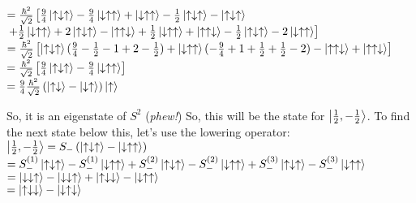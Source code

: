 \documentclass[12pt]{article}
\begin{document}
\begin{enumerate}[label=\alph*)]
$=\frac{\hbar^2}{\sqrt{2}}\left[\frac{9}{4}\ket{\uparrow\downarrow\uparrow} - \frac{9}{4}\ket{\downarrow\uparrow\uparrow} + \ket{\downarrow\uparrow\uparrow} - \frac{1}{2}\ket{\uparrow\downarrow\uparrow}-\ket{\uparrow\downarrow\uparrow} \right.$\vspace{0.5em}\\
\hspace*{3em}$\left.+ \frac{1}{2}\ket{\downarrow\uparrow\uparrow} + 2\ket{\uparrow\downarrow\uparrow}- \ket{\uparrow\uparrow\downarrow} + \frac{1}{2}\ket{\downarrow\uparrow\uparrow} + \ket{\uparrow\uparrow\downarrow}-\frac{1}{2}\ket{\uparrow\downarrow\uparrow}-2\ket{\downarrow\uparrow\uparrow}\right]$\vspace{0.5em}\\
$=\frac{\hbar^2}{\sqrt{2}}\left[\ket{\uparrow\downarrow\uparrow}(\frac{9}{4}-\frac{1}{2}-1+2-\frac{1}{2}) + \ket{\downarrow\uparrow\uparrow}(-\frac{9}{4}+1 + \frac{1}{2}+\frac{1}{2}-2) -\ket{\uparrow\uparrow\downarrow} + \ket{\uparrow\uparrow\downarrow}\right]$\vspace{0.5em}\\
$= \frac{\hbar^2}{\sqrt{2}}\left[\frac{9}{4}\ket{\uparrow\downarrow\uparrow} - \frac{9}{4}\ket{\downarrow\uparrow\uparrow}\right]$\vspace{0.5em}\\
$= \frac{9}{4}\frac{\hbar^2}{\sqrt{2}}\left(\ket{\uparrow\downarrow} - \ket{\downarrow\uparrow}\right)\ket{\uparrow}$

So, it is an eigenstate of $S^2$ ({\sl phew!}) So, this will be the state for $\ket{\frac{1}{2}, -\frac{1}{2}}$. To find the next state below this, let's use the lowering operator:\vspace{0.5em}\\
$\ket{\frac{1}{2}, -\frac{1}{2}} = S_-\left(\ket{\uparrow\downarrow\uparrow} - \ket{\downarrow\uparrow\uparrow}\right)$\vspace{0.5em}\\
\hspace*{3.5em}$=S_-^{(1)}\ket{\uparrow\downarrow\uparrow}-S_-^{(1)}\ket{\downarrow\uparrow\uparrow} + S_-^{(2)}\ket{\uparrow\downarrow\uparrow}-S_-^{(2)}\ket{\downarrow\uparrow\uparrow}+S_-^{(3)}\ket{\uparrow\downarrow\uparrow} - S_-^{(3)}\ket{\downarrow\uparrow\uparrow}$\vspace{0.5em}\\
\hspace*{3.5em}$= \ket{\downarrow\downarrow\uparrow} - \ket{\downarrow\downarrow\uparrow}+\ket{\uparrow\downarrow\downarrow}-\ket{\downarrow\uparrow\uparrow}$\vspace{0.5em}\\
\hspace*{3.5em}$= \ket{\uparrow\downarrow\downarrow} - \ket{\downarrow\uparrow\downarrow}$


\end{enumerate}
\end{document}
